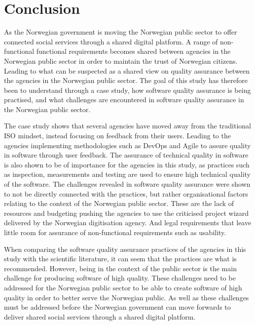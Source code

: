 \chapter{Conclusion} \label{sec:conclusion}
As the Norwegian government is moving the Norwegian public sector to offer connected social services through a shared digital platform. A range of non-functional functional requirements becomes shared between agencies in the Norwegian public sector in order to maintain the trust of Norwegian citizens. Leading to what can be suspected as a shared view on quality assurance between the agencies in the Norwegian public sector. The goal of this study has therefore been to understand through a case study, how software quality assurance is being practised, and what challenges are encountered in software quality assurance in the Norwegian public sector.

The case study shows that several agencies have moved away from the traditional ISO mindset, instead focusing on feedback from their users. Leading to the agencies implementing methodologies such as DevOps and Agile to assure quality in software through user feedback. The assurance of technical quality in software is also shown to be of importance for the agencies in this study, as practices such as inspection, measurements and testing are used to ensure high technical quality of the software. The challenges revealed in software quality assurance were shown to not be directly connected with the practices, but rather organisational factors relating to the context of the Norwegian public sector. These are the lack of resources and budgeting pushing the agencies to use the criticised project wizard delivered by the Norwegian digitisation agency. And legal requirements that leave little room for assurance of non-functional requirements such as usability.

\newpage

When comparing the software quality assurance practices of the agencies in this study with the scientific literature, it can seem that the practices are what is recommended. However, being in the context of the public sector is the main challenge for producing software of high quality. These challenges need to be addressed for the Norwegian public sector to be able to create software of high quality in order to better serve the Norwegian public. As well as these challenges must be addressed before the Norwegian government can move forwards to deliver shared social services through a shared digital platform.

